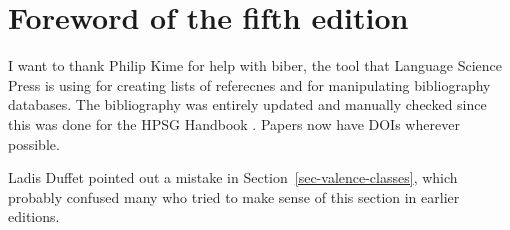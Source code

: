 
\section*{Foreword of the fifth edition}

I want to thank Philip Kime for help with biber, the tool that Language Science Press is using for
creating lists of referecnes and for manipulating bibliography databases. The bibliography was
entirely updated and manually checked since this was done for the HPSG Handbook \citep*{HPSGHandbook}. Papers
now have DOIs wherever possible.

Ladis Duffet pointed out a mistake in Section~\ref{sec-valence-classes}, which probably confused many who tried to make
sense of this section in earlier editions.










%
%
%
%
%
%


